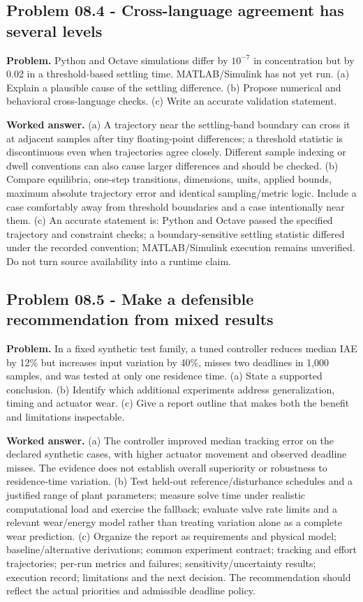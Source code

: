 \documentclass[11pt,a4paper]{article}
\begin{document}
\subsection{Problem 08.4 - Cross-language agreement has several levels}
\textbf{Problem.} Python and Octave simulations differ by $10^{-7}$ in concentration but by 0.02 in a threshold-based settling time. MATLAB/Simulink has not yet run. (a) Explain a plausible cause of the settling difference. (b) Propose numerical and behavioral cross-language checks. (c) Write an accurate validation statement.


\textbf{Worked answer.} (a) A trajectory near the settling-band boundary can cross it at adjacent samples after tiny floating-point differences; a threshold statistic is discontinuous even when trajectories agree closely. Different sample indexing or dwell conventions can also cause larger differences and should be checked. (b) Compare equilibria, one-step transitions, dimensions, units, applied bounds, maximum absolute trajectory error and identical sampling/metric logic. Include a case comfortably away from threshold boundaries and a case intentionally near them. (c) An accurate statement is: Python and Octave passed the specified trajectory and constraint checks; a boundary-sensitive settling statistic differed under the recorded convention; MATLAB/Simulink execution remains unverified. Do not turn source availability into a runtime claim.

\subsection{Problem 08.5 - Make a defensible recommendation from mixed results}
\textbf{Problem.} In a fixed synthetic test family, a tuned controller reduces median IAE by 12\% but increases input variation by 40\%, misses two deadlines in 1,000 samples, and was tested at only one residence time. (a) State a supported conclusion. (b) Identify which additional experiments address generalization, timing and actuator wear. (c) Give a report outline that makes both the benefit and limitations inspectable.


\textbf{Worked answer.} (a) The controller improved median tracking error on the declared synthetic cases, with higher actuator movement and observed deadline misses. The evidence does not establish overall superiority or robustness to residence-time variation. (b) Test held-out reference/disturbance schedules and a justified range of plant parameters; measure solve time under realistic computational load and exercise the fallback; evaluate valve rate limits and a relevant wear/energy model rather than treating variation alone as a complete wear prediction. (c) Organize the report as requirements and physical model; baseline/alternative derivations; common experiment contract; tracking and effort trajectories; per-run metrics and failures; sensitivity/uncertainty results; execution record; limitations and the next decision. The recommendation should reflect the actual priorities and admissible deadline policy.
\end{document}
